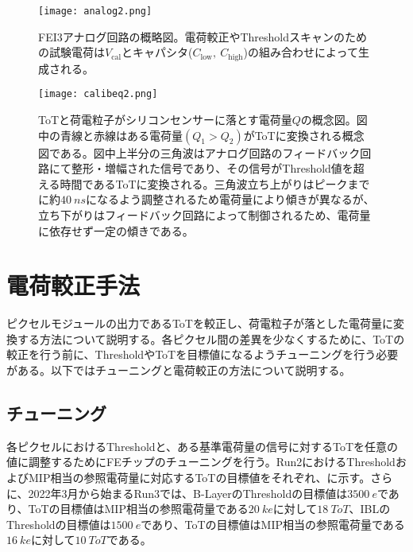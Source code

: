 \begin{figure}[tbp]
  \centering
  \texttt{[image: analog2.png]}
  \caption[FEI3アナログ回路の概略図]{FEI3アナログ回路の概略図。電荷較正やThresholdスキャンのための試験電荷は$V_\mathrm{cal}$とキャパシタ($C_\mathrm{low},\ C_\mathrm{high}$)の組み合わせによって生成される。}
  \label{fig:analog}
\end{figure}

\begin{figure}[tbp]
  \centering
  \texttt{[image: calibeq2.png]}
  \caption[ToTと荷電粒子がシリコンセンサーに落とす電荷量$Q$の概念図]{ToTと荷電粒子がシリコンセンサーに落とす電荷量$Q$の概念図。図中の青線と赤線はある電荷量$(Q_1>Q_2)$がToTに変換される概念図である。図中上半分の三角波はアナログ回路のフィードバック回路にて整形・増幅された信号であり、その信号がThreshold値を超える時間であるToTに変換される。三角波立ち上がりはピークまでに約$40\ \si{ns}$になるよう調整されるため電荷量により傾きが異なるが、立ち下がりはフィードバック回路によって制御されるため、電荷量に依存せず一定の傾きである。}
  \label{fig:sannkakuha}
\end{figure}



\section{電荷較正手法}
\label{sec:calibway}
ピクセルモジュールの出力であるToTを較正し、荷電粒子が落とした電荷量に変換する方法について説明する。各ピクセル間の差異を少なくするために、ToTの較正を行う前に、ThresholdやToTを目標値になるようチューニングを行う必要がある。以下ではチューニングと電荷較正の方法について説明する。


\subsection{チューニング}
\label{sec:tuning}
各ピクセルにおけるThresholdと、ある基準電荷量の信号に対するToTを任意の値に調整するためにFEチップのチューニングを行う。Run2におけるThresholdおよびMIP相当の参照電荷量に対応するToTの目標値をそれぞれ、に示す。さらに、2022年3月から始まるRun3では、B-LayerのThresholdの目標値は$3500\ \si{e}$であり、ToTの目標値はMIP相当の参照電荷量である$20\ \si{ke}$に対して$18\ \si{ToT}$、IBLのThresholdの目標値は$1500\ \si{e}$であり、ToTの目標値はMIP相当の参照電荷量である$16\ \si{ke}$に対して$10\ \si{ToT}$である。

